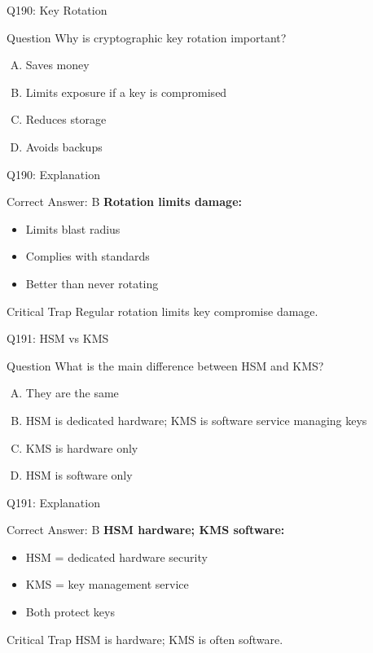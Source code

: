 \documentclass{beamer}
\begin{document}
	\begin{frame}{Q190: Key Rotation}
		\begin{block}{Question}
			Why is cryptographic key rotation important?
		\end{block}
		\begin{enumerate}[(A)]
			\item Saves money
			\item Limits exposure if a key is compromised
			\item Reduces storage
			\item Avoids backups
		\end{enumerate}
	\end{frame}
	
	\begin{frame}{Q190: Explanation}
		\begin{block}{Correct Answer: B}
			\textbf{Rotation limits damage:}
			\begin{itemize}
				\item Limits blast radius
				\item Complies with standards
				\item Better than never rotating
			\end{itemize}
		\end{block}
		\begin{alertblock}{Critical Trap}
			Regular rotation limits key compromise damage.
		\end{alertblock}
	\end{frame}
	
	\begin{frame}{Q191: HSM vs KMS}
		\begin{block}{Question}
			What is the main difference between HSM and KMS?
		\end{block}
		\begin{enumerate}[(A)]
			\item They are the same
			\item HSM is dedicated hardware; KMS is software service managing keys
			\item KMS is hardware only
			\item HSM is software only
		\end{enumerate}
	\end{frame}
	
	\begin{frame}{Q191: Explanation}
		\begin{block}{Correct Answer: B}
			\textbf{HSM hardware; KMS software:}
			\begin{itemize}
				\item HSM = dedicated hardware security
				\item KMS = key management service
				\item Both protect keys
			\end{itemize}
		\end{block}
		\begin{alertblock}{Critical Trap}
			HSM is hardware; KMS is often software.
		\end{alertblock}
	\end{frame}
	
\end{document}
